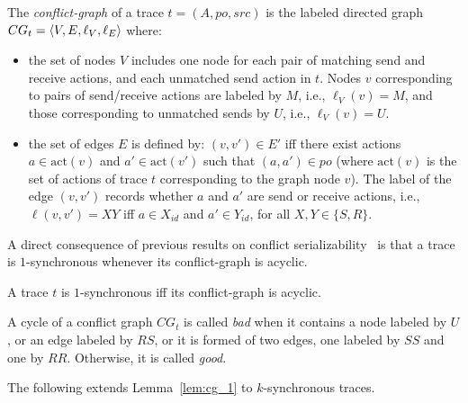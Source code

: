 
\begin{definition}\label{def:conf_graph}
    The \emph{conflict-graph} of a trace $t=(A,po,src)$ is the labeled directed graph $CG_t=\left\langle {V,E,\ell_V,\ell_E} \right\rangle$ where:
\begin{itemize}
	\item the set of nodes $V$ includes one node for each pair of matching send and receive actions, and each unmatched send action in $t$. Nodes $v$ corresponding to pairs of send/receive actions are labeled by $M$, i.e., $\ell_V(v)=M$, and those corresponding to unmatched sends by $U$, i.e., $\ell_V(v)=U$.
    	\item the set of edges $E$ is defined by: $(v,v') \in E'$ iff there exist actions $a \in \mathrm{act}(v)$ and $a' \in \mathrm{act}(v')$ such that $(a,a') \in po$ (where $\mathrm{act}(v)$ is the set of actions of trace $t$ corresponding to the graph node $v$). The label of the edge $(v,v')$ records whether $a$ and $a'$ are send or receive actions, i.e., $\ell(v,v')=XY$ iff $a\in X_{id}$ and $a'\in Y_{id}$, for all $X,Y\in \{S,R\}$.
\end{itemize}
\end{definition}

A direct consequence of previous results on conflict serializability~\cite{} is that 
a trace is $1$-synchronous whenever its conflict-graph is acyclic.

\begin{lemma}\label{lem:cg_1}
A trace $t$ is $1$-synchronous if{f} its conflict-graph is acyclic.
\end{lemma}

A cycle of a conflict graph $CG_t$ is called \emph{bad} when it contains a node labeled by $U$, or an edge labeled by $RS$, or it is formed of two edges, one labeled by $SS$ and one by $RR$. Otherwise, it is called \emph{good}.

The following extends Lemma~\ref{lem:cg_1} to $k$-synchronous traces.

